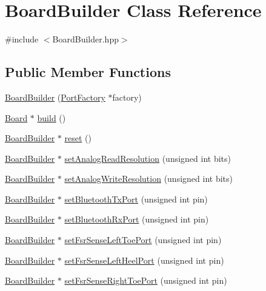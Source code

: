\hypertarget{classBoardBuilder}{}\section{Board\+Builder Class Reference}
\label{classBoardBuilder}


{\ttfamily \#include $<$Board\+Builder.\+hpp$>$}

\subsection*{Public Member Functions}
\begin{DoxyCompactItemize}
\item 
\hyperlink{classBoardBuilder_a96de7aa9414b8233c4f8f9f4b0c2378b}{Board\+Builder} (\hyperlink{classPortFactory}{Port\+Factory} $\ast$factory)
\item 
\hyperlink{classBoard}{Board} $\ast$ \hyperlink{classBoardBuilder_a54e6fefa54dd28ccefff493340d059b8}{build} ()
\item 
\hyperlink{classBoardBuilder}{Board\+Builder} $\ast$ \hyperlink{classBoardBuilder_a5f209e1e57e7f51561a584ec457c1ae1}{reset} ()
\item 
\hyperlink{classBoardBuilder}{Board\+Builder} $\ast$ \hyperlink{classBoardBuilder_a5f060b3b6657e42843e3dc2b3913aa59}{set\+Analog\+Read\+Resolution} (unsigned int bits)
\item 
\hyperlink{classBoardBuilder}{Board\+Builder} $\ast$ \hyperlink{classBoardBuilder_add1ea38ecb43ad1bf19492e29f371419}{set\+Analog\+Write\+Resolution} (unsigned int bits)
\item 
\hyperlink{classBoardBuilder}{Board\+Builder} $\ast$ \hyperlink{classBoardBuilder_aa0fcbb800265122308e056290ca8c388}{set\+Bluetooth\+Tx\+Port} (unsigned int pin)
\item 
\hyperlink{classBoardBuilder}{Board\+Builder} $\ast$ \hyperlink{classBoardBuilder_a287c7040804b1a350e68897367985b0b}{set\+Bluetooth\+Rx\+Port} (unsigned int pin)
\item 
\hyperlink{classBoardBuilder}{Board\+Builder} $\ast$ \hyperlink{classBoardBuilder_a3468d390b55cf40d3b7f74ea3a48dcea}{set\+Fsr\+Sense\+Left\+Toe\+Port} (unsigned int pin)
\item 
\hyperlink{classBoardBuilder}{Board\+Builder} $\ast$ \hyperlink{classBoardBuilder_a36a30c9d82d5d04d8b90fb84c1167f32}{set\+Fsr\+Sense\+Left\+Heel\+Port} (unsigned int pin)
\item 
\hyperlink{classBoardBuilder}{Board\+Builder} $\ast$ \hyperlink{classBoardBuilder_ac999b3229bfaff8e3ef1c5fa2100f28b}{set\+Fsr\+Sense\+Right\+Toe\+Port} (unsigned int pin)

\end{DoxyCompactItemize}
